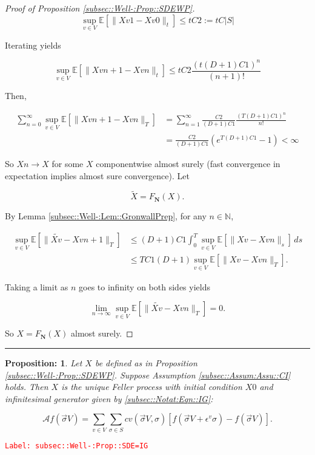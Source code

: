 \documentclass[12pt]{article}
\newcommand{\mb}{\mathbb}
\newcommand{\mc}{\mathcal}
\newcommand{\ra}{\rightarrow}
\newcommand{\ep}{\epsilon}
\newcommand{\tr}{\textcolor{red}}
\newcommand{\labe}[1]{\tr{\texttt{Label: #1}}}
\newcommand{\lin}{\rule{\linewidth}{0.4 pt}}
\newcommand{\ex}[1]{\mb{E}\left[#1\right]}			%
\newcommand{\defeq}{:=}								%
\renewcommand{\v}{v}							%
\renewcommand{\S}{S}							%
\newcommand{\s}{\sigma}							%
\newcommand{\sv}{\vec{\s}}						%
\newcommand{\ev}[1]{\ep^{#1}}					%
\newcommand{\T}{T}								%
\renewcommand{\t}{t}							%
\renewcommand{\tt}{s}							%
\newcommand{\X}{X}								%
\newcommand{\IG}{\mc{A}}						%
\newcommand{\IGr}{c}							%
\newcommand{\const}{C}							%
\newcommand{\degr}{D}							%
\newcommand{\poisses}{\mathbf{N}}				%
\newcommand{\XState}[1]{\S^{#1}}				%
\newcommand{\alt}{\widetilde}						%
\newtheorem{prop}[thms]{Proposition: }
\begin{document}
\begin{proof}[Proof of Proposition \ref{subsec::Well-:Prop::SDEWP}]
\[\sup_{\v \in  V}\ex{\|\X{\v}{}{1} - \X{\v}{}{0}\|_\t} \leq \t\const{2} \defeq \t\const{}|\S|\]

Iterating yields

\[\sup_{\v \in  V} \ex{\|\X{\v}{}{n+1} - \X{\v}{}{n}\|_\t} \leq \t\const{2}\frac{(\t(\degr+1)\const{1})^n}{(n+1)!}\]

Then,

\begin{align*}
\sum_{n=0}^\infty \sup_{\v \in  V} \ex{\|\X{\v}{}{n+1} - \X{\v}{}{n}\|_\T} &= \sum_{n=1}^\infty \frac{\const{2}}{(\degr+1)\const{1}}\frac{(\T(\degr+1)\const{1})^{n}}{n !}\\
& = \frac{\const{2}}{(\degr+1)\const{1}}(e^{\T(\degr+1)\const{1}} - 1) < \infty
\end{align*}


So \(\X{}{}{n} \ra \X{}{}\) for some \(\X{}{}\) componentwise almost surely (fast convergence in expectation implies almost sure convergence). Let 

\[\alt{\X{}{}} = F_\poisses(\X{}{}).\]

By Lemma \ref{subsec::Well-:Lem::GronwallPrep}, for any \(n\in\mb{N}\),

\begin{align*}
\sup_{\v \in  V} \ex{\|\alt{\X{\v}{}} - \X{\v}{}{n+1}\|_\T} &\leq (\degr+1)\const{1}\int_0^\T \sup_{\v \in  V}\ex{\|\X{\v}{} - \X{\v}{}{n}\|_\tt}\,d\tt \\
&\leq \T\const{1}(\degr+1)\sup_{\v\in  V} \ex{\|\X{\v}{} - \X{\v}{}{n}\|_\T}.
\end{align*}

Taking a limit as \(n\) goes to infinity on both sides yields

\[\lim_{n\ra\infty} \sup_{\v \in  V} \ex{\|\alt{\X{\v}{}} - \X{\v}{}{n}\|_\T} = 0.\]

So \(\X{}{}= F_\poisses(\X{}{})\) almost surely.
\end{proof}

\lin

\begin{prop}
Let \(\X{}{}\) be defined as in Proposition \ref{subsec::Well-:Prop::SDEWP}. Suppose Assumption \ref{subsec::Assum:Assu::CI} holds. Then \(\X{}{}\) is the unique Feller process with initial condition \(\X{}{0}\) and infinitesimal generator given by \eqref{subsec::Notat:Eqn::IG}:

\[\IG f(\sv{}{ V}) = \sum_{\v\in  V}\sum_{\s \in \S} \IGr{\v}(\sv{}{ V},\s)[f(\sv{}{ V} + \ev{\v}\s) - f(\sv{}{ V})].\]
\label{subsec::Well-:Prop::SDE=IG}
\end{prop}
\labe{subsec::Well-:Prop::SDE=IG}
\end{document}

